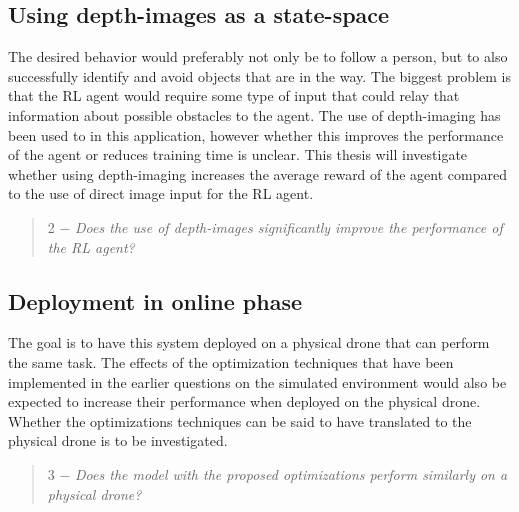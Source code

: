 \subsection{Using depth-images as a state-space}
The desired behavior would preferably not only be to follow a person, but to also 
successfully identify and avoid objects that are in the way. The biggest problem 
is that the RL agent would require some type of input that could relay that information 
about possible obstacles to the agent. The use of depth-imaging has been used to 
in this application, however whether this improves the performance of the agent or 
reduces training time is unclear. This thesis will investigate whether using depth-imaging 
increases the average reward of the agent compared to the use of 
direct image input for the RL agent. 

\begin{quote}
    \label{research2}
    2 $-$ \textit{Does the use of depth-images significantly improve the performance of the RL agent?}
\end{quote}

\subsection{Deployment in online phase}
The goal is to have this system deployed on a physical drone that can perform 
the same task. The effects of the optimization techniques that have been 
implemented in the earlier questions on the simulated environment would also be 
expected to increase their performance when deployed on the physical drone. 
Whether the optimizations techniques can be said to have translated to the 
physical drone is to be investigated. 

\begin{quote}
    \label{research3}
    3 $-$ \textit{Does the model with the proposed optimizations perform similarly on a physical drone?}
\end{quote}
